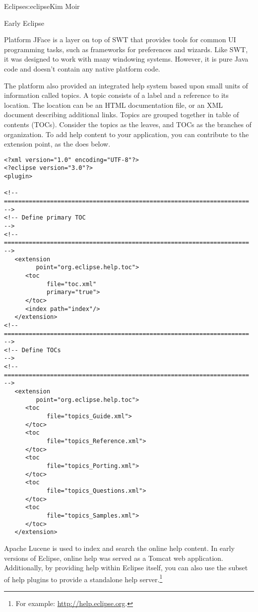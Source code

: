\begin{aosachapter}{Eclipse}{s:eclipse}{Kim Moir}
\begin{aosasect1}{Early Eclipse}
\begin{aosasect2}{Platform}
JFace is a layer on top of SWT that provides tools for common UI
programming tasks, such as frameworks for preferences and
wizards. Like SWT, it was designed to work with many windowing
systems. However, it is pure Java code and doesn't contain any native
platform code.

The platform also provided an integrated help system based upon small
units of information called topics. A topic consists of a label and a
reference to its location.  The location can be an HTML documentation
file, or an XML document describing additional links.  Topics are
grouped together in table of contents (TOCs).  Consider the topics as
the leaves, and TOCs as the branches of organization. To add help
content to your application, you can contribute to the
 extension point, as the
  does below.

\begin{verbatim}
<?xml version="1.0" encoding="UTF-8"?>
<?eclipse version="3.0"?>
<plugin>

<!-- ===================================================================== -->
<!-- Define primary TOC                                                    -->
<!-- ===================================================================== -->
   <extension
         point="org.eclipse.help.toc">
      <toc
            file="toc.xml"
            primary="true">
      </toc>
      <index path="index"/>
   </extension>
<!-- ===================================================================== -->
<!-- Define TOCs                                                           -->
<!-- ===================================================================== -->
   <extension
         point="org.eclipse.help.toc">
      <toc
            file="topics_Guide.xml">
      </toc>
      <toc
            file="topics_Reference.xml">
      </toc>
      <toc
            file="topics_Porting.xml">
      </toc>
      <toc
            file="topics_Questions.xml">
      </toc>
      <toc
            file="topics_Samples.xml">
      </toc>
   </extension>
\end{verbatim}

Apache Lucene is used to index and search the online help content. In
early versions of Eclipse, online help was served as a Tomcat web
application. Additionally, by providing help within Eclipse itself, you
can also use the subset of help plugins to provide a standalone help
server.\footnote{For example: \url{http://help.eclipse.org}.}


\end{aosasect2}
\end{aosasect1}
\end{aosachapter}
